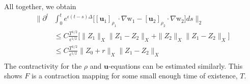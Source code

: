 \documentclass[11pt,letterpaper]{amsart}
\theoremstyle{plain}
\theoremstyle{definition}
\theoremstyle{remark}
\renewcommand{\leq}{\leqslant}
\def\u{\textbf{u}}
\def \wt {\mathrm{w}}
\begin{document}
All together, we obtain 
\begin{align*}
    \Big\| \partial^l 
        &\int_0^t e^{\epsilon(t-s) \Delta} \Big[ 
            [\u_1]_{\rho_1} \cdot \nabla \wt_1 -  [\u_2]_{\rho_2} \cdot \nabla \wt_2 \Big] ds \Big\|_2 \\
        &\leq C \frac{T^{1/2}}{\epsilon^{1/2}} \Big[
            \| Z_1\|_X \|Z_1 - Z_2\|_{X} + \|Z_2\|_X \| Z_1 - Z_2 \|_X 
         \Big] \\
        &\leq C \frac{T^{1/2}}{\epsilon^{1/2}} 
            \|Z_0 + r\|_X \| Z_1 - Z_2 \|_X  \\
\end{align*}
The contractivity for the $\rho$ and $\u$-equations can be estimated similarly.
This shows $F$ is a contraction mapping for some small enough time of existence, $T$. 
\end{document}
